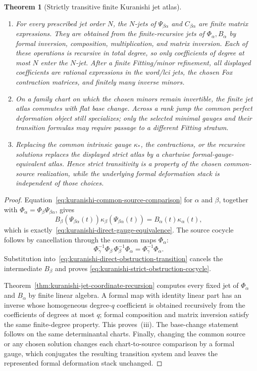 \documentclass[11pt]{article}
\newtheorem{theorem}{Theorem}[section]
\theoremstyle{definition}
\begin{document}
\begin{theorem}[Strictly transitive finite Kuranishi jet atlas]
\begin{enumerate}[label=\textnormal{(\roman*)}]
\item For every prescribed jet order $N$, the $N$-jets of
$\Psi_{\beta\alpha}$ and $C_{\beta\alpha}$ are finite matrix expressions.
They are obtained from the finite-recursive jets of $\Phi_\alpha,B_\alpha$
by formal inversion, composition, multiplication, and matrix inversion.  Each
of these operations is recursive in total degree, so only coefficients of
degree at most $N$ enter the $N$-jet.  After a finite Fitting/minor refinement,
all displayed coefficients are rational expressions in the word/lci jets,
the chosen Fox contraction matrices, and finitely many inverse minors.

\item On a family chart on which the chosen minors remain invertible, the
finite jet atlas commutes with flat base change.  Across a rank jump the common
perfect deformation object still specializes; only the selected minimal gauges
and their transition formulas may require passage to a different Fitting
stratum.

\item Replacing the common intrinsic gauge $\kappa_*$, the contractions, or
the recursive solutions replaces the displayed strict atlas by a chartwise
formal-gauge-equivalent atlas.  Hence strict transitivity is a property of the
chosen common-source realization, while the underlying formal deformation
stack is independent of those choices.
\end{enumerate}
\end{theorem}

\begin{proof}
Equation~\eqref{eq:kuranishi-common-source-comparison} for $\alpha$ and
$\beta$, together with
$\Phi_\alpha=\Phi_\beta\Psi_{\beta\alpha}$, gives
\[
 B_\beta\!\left(\Psi_{\beta\alpha}(t)\right)
 \kappa_\beta\!\left(\Psi_{\beta\alpha}(t)\right)
 =B_\alpha(t)\kappa_\alpha(t),
\]
which is exactly~\eqref{eq:kuranishi-direct-gauge-equivalence}.
The source cocycle follows by cancellation through the common maps
$\Phi_\alpha$:
\[
 \Phi_\gamma^{-1}\Phi_\beta\,
 \Phi_\beta^{-1}\Phi_\alpha
 =\Phi_\gamma^{-1}\Phi_\alpha.
\]
Substitution into~\eqref{eq:kuranishi-direct-obstruction-transition} cancels
the intermediate $B_\beta$ and proves
\eqref{eq:kuranishi-strict-obstruction-cocycle}.

Theorem~\ref{thm:kuranishi-jet-coordinate-recursion} computes every fixed jet
of $\Phi_\alpha$ and $B_\alpha$ by finite linear algebra.  A formal map with
identity linear part has an inverse whose homogeneous degree-$q$ coefficient
is obtained recursively from the coefficients of degrees at most $q$; formal
composition and matrix inversion satisfy the same finite-degree property.
This proves~(iii).  The base-change statement follows on the same determinantal
charts.  Finally, changing the common source or any chosen solution changes
each chart-to-source comparison by a formal gauge, which conjugates the
resulting transition system and leaves the represented formal deformation
stack unchanged.
\end{proof}
\end{document}
